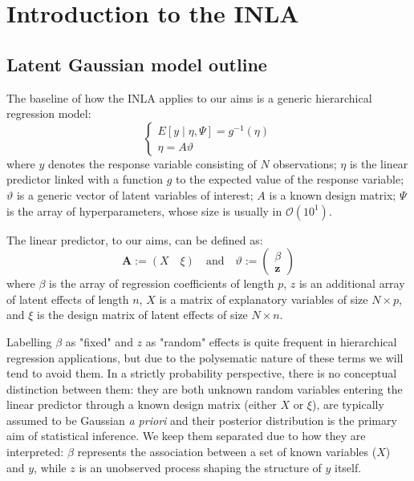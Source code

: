\documentclass[openany]{book}
\begin{document}



\section{Introduction to the INLA}\label{section:inla}

\subsection{Latent Gaussian model outline}\label{par:LGM}
The baseline of how the INLA applies to our aims is a generic hierarchical regression model:
$$
\left\{ \begin{array}{ll} 
E[y\mid \eta, \Psi] = g^{-1}(\eta)\\
\eta = A \vartheta
\end{array} \right. 
$$
where $y$  denotes the response variable consisting of $N$ observations; $\eta$ is the linear predictor linked with a function $g$ to the expected value of the response variable; $\vartheta$ is a generic vector of latent variables of interest; $A$ is a known design matrix; $\Psi$ is the array of hyperparameters, whose size is usually in $\mathcal{O}(10^1)$. 

The linear predictor, to our aims, can be defined as:
$$  
\mathbf{A} := \left(X \quad \xi \right) \quad \text{and} \quad
\vartheta := \begin{pmatrix} \beta \\ \mathbf{z} \end{pmatrix}
$$
where $\beta$ is the array of regression coefficients of length $p$, $z$ is an additional array of latent effects of length $n$, $X$ is a matrix of explanatory variables of size $N \times p$, and $\xi$ is the design matrix of latent effects of size $N \times n$.

Labelling $\beta$ as "fixed" and $z$ as "random" effects is quite frequent in hierarchical regression applications, but due to the polysematic nature of these terms we will tend to avoid them. In a strictly probability perspective, there is no conceptual distinction between them: they are both unknown random variables entering the linear predictor through a known design matrix (either $X$ or $\xi$), are typically assumed to be Gaussian \textit{a priori} and their posterior distribution is the primary aim of statistical inference. We keep them separated due to how they are interpreted: $\beta$ represents the association between a set of known variables ($X$) and $y$, while $z$ is an unobserved process shaping the structure of $y$ itself.
\end{document}
